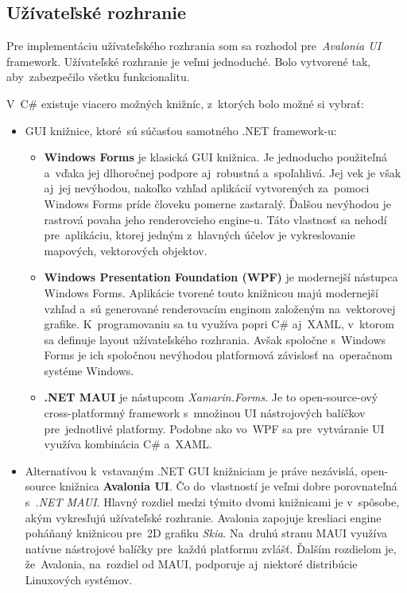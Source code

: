 \subsection{Užívateľské rozhranie}

Pre implementáciu užívateľského rozhrania som sa rozhodol pre~\textit{Avalonia UI} framework. Užívateľské rozhranie je veľmi jednoduché. Bolo vytvorené tak, aby~zabezpečilo všetku funkcionalitu.

V~C\# existuje viacero možných knižníc, z~ktorých bolo možné si vybrať:
\begin{itemize}
    \item GUI knižnice, ktoré~sú súčasťou samotného .NET framework-u:
    \begin{itemize}
        \item \textbf{Windows Forms} je klasická GUI knižnica. Je jednoducho použiteľná a~vďaka jej dlhoročnej podpore aj~robustná a~spoľahlivá. Jej vek je však aj~jej nevýhodou, nakoľko vzhľad aplikácií vytvorených za~pomoci Windows Forms príde človeku pomerne zastaralý. Ďalšou nevýhodou je rastrová povaha jeho renderovcieho engine-u. Táto vlastnosť sa nehodí pre~aplikáciu, ktorej jedným z~hlavných účelov je vykreslovanie mapových, vektorových objektov.     
        \item \textbf{Windows Presentation Foundation (WPF)} je modernejší nástupca Windows Forms. Aplikácie tvorené touto knižnicou majú modernejší vzhľad a~sú generované renderovacím enginom založeným na~vektorovej grafike. K~programovaniu sa tu využíva popri C\# aj~XAML, v~ktorom sa definuje layout užívateľského rozhrania. Avšak spoločne s~Windows Forms je ich spoločnou nevýhodou platformová závislosť na~operačnom systéme Windows.
        \item \textbf{.NET MAUI} je nástupcom \textit{Xamarin.Forms}. Je to open-source-ový cross-platformný framework s~množinou UI nástrojových balíčkov pre~jednotlivé platformy. Podobne ako vo~WPF sa pre~vytváranie UI využíva kombinácia C\# a~XAML. 
    \end{itemize}
    \item Alternatívou k~vstavaným .NET GUI knižniciam je práve nezávislá, open-source knižnica \textbf{Avalonia UI}. Čo do~vlastností je veľmi dobre porovnateľná s~\textit{.NET MAUI}. Hlavný rozdiel medzi týmito dvomi knižnicami je v~spôsobe, akým vykresľujú užívateľské rozhranie. Avalonia zapojuje kresliaci engine poháňaný knižnicou pre~2D grafiku \textit{Skia}. Na~druhú stranu MAUI využíva natívne nástrojové balíčky pre~každú platformu zvlášť. Ďalším rozdielom je, že~Avalonia, na~rozdiel od MAUI, podporuje aj~niektoré distribúcie Linuxových systémov.
\end{itemize}

